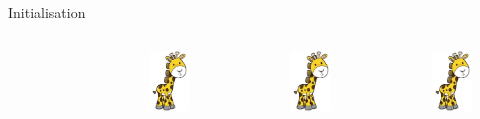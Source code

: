 \documentclass[24pt]{beamer}
\begin{document}
\begin{frame}{Initialisation}
\begin{columns}
\begin{figure}
                \end{figure}
                \begin{figure}
                \includegraphics[scale=0.1]{giraffe}
                \end{figure}
                \begin{figure}
                \includegraphics[scale=0.1]{giraffe}
                \end{figure}
                \begin{figure}
                \includegraphics[scale=0.1]{giraffe}

\end{figure}
\end{columns}
\end{frame}
\end{document}
